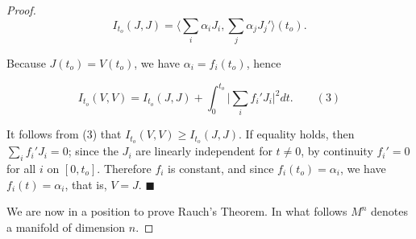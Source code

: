 \begin{proof}
  $$
  I_{t_o}(J,J)=\Big\langle\sum_i\alpha_iJ_i,\sum_j\alpha_jJ_j'\Big\rangle(t_o).
  $$
  
  Because $J(t_o)=V(t_o)$, we have $\alpha_i=f_i(t_o)$, hence
  
  $$
  I_{t_o}(V,V)=I_{t_o}(J,J)+\int_0^{t_o}\Big|\sum_i f_i'J_i\Big|^2 dt.\qquad(3)
  $$
  
  It follows from (3) that $I_{t_o}(V,V)\geq I_{t_o}(J,J)$. If equality holds, then
  $\sum_i f_i'J_i=0$; since the $J_i$ are linearly independent for $t\neq 0$, by
  continuity $f_i'=0$ for all $i$ on $[0,t_o]$. Therefore $f_i$ is constant, and
  since $f_i(t_o)=\alpha_i$, we have $f_i(t)=\alpha_i$, that is, $V=J$. $\blacksquare$
  
  We are now in a position to prove Rauch's Theorem. In what follows $M^n$ denotes
  a manifold of dimension $n$.
\end{proof}

